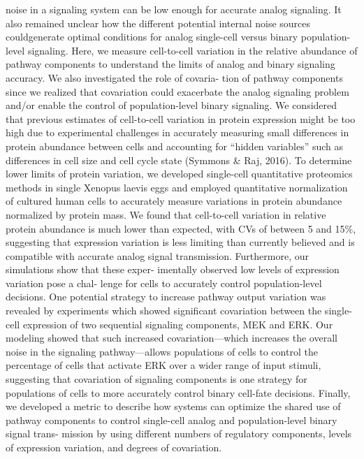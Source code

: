 noise in a signaling system can be low enough for accurate analog signaling. It also remained unclear how the different potential internal noise sources couldgenerate optimal conditions for analog single-cell versus binary population-level signaling. Here, we measure cell-to-cell variation in the relative abundance
of pathway components to understand the limits of analog and binary signaling accuracy. We also investigated the role of covaria- tion of pathway components since we realized that covariation could exacerbate the analog signaling problem and/or enable the control of population-level binary signaling. We considered that previous estimates of cell-to-cell variation in protein expression might be too high due to experimental challenges in accurately measuring small differences in protein abundance between cells and accounting for “hidden variables” such as differences in cell size and cell cycle state (Symmons & Raj, 2016). To determine lower limits of protein variation, we developed single-cell quantitative proteomics methods in single Xenopus laevis eggs and employed quantitative normalization of cultured human cells to accurately measure variations in protein abundance normalized by protein mass. We found that cell-to-cell variation in relative protein abundance is much lower than expected, with CVs of between 5 and 15\%, suggesting that expression variation is less limiting than currently believed and is compatible with accurate analog signal transmission. Furthermore, our simulations show that these exper- imentally observed low levels of expression variation pose a chal- lenge for cells to accurately control population-level decisions. One potential strategy to increase pathway output variation was revealed by experiments which showed significant covariation between the single-cell expression of two sequential signaling components, MEK and ERK. Our modeling showed that such increased covariation—which increases the overall noise in the signaling pathway—allows populations of cells to control the percentage of cells that activate ERK over a wider range of input stimuli, suggesting that covariation of signaling components is one strategy for populations of cells to more accurately control binary cell-fate decisions. Finally, we developed a metric to describe how systems can optimize the shared use of pathway components to control single-cell analog and population-level binary signal trans- mission by using different numbers of regulatory components, levels of expression variation, and degrees of covariation.


